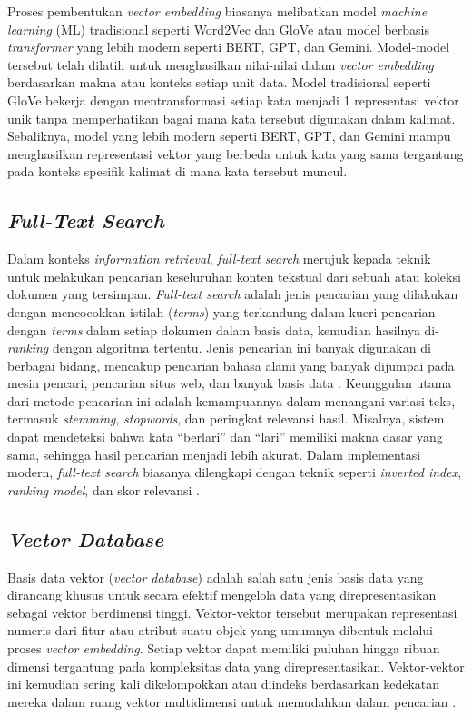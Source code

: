Proses pembentukan \textit{vector embedding} biasanya melibatkan model \textit{machine learning} (ML) tradisional seperti Word2Vec dan GloVe atau model berbasis \textit{transformer} yang lebih modern seperti BERT, GPT, dan Gemini.
Model-model tersebut telah dilatih untuk menghasilkan nilai-nilai dalam \textit{vector embedding} berdasarkan makna atau konteks setiap unit data.
Model tradisional seperti GloVe bekerja dengan mentransformasi setiap kata menjadi 1 representasi vektor unik tanpa memperhatikan bagai mana kata tersebut digunakan dalam kalimat.
Sebaliknya, model yang lebih modern seperti BERT, GPT, dan Gemini mampu menghasilkan representasi vektor yang berbeda untuk kata yang sama tergantung pada konteks spesifik kalimat di mana kata tersebut muncul.

\subsection{\textit{Full-Text Search}}
Dalam konteks \textit{information retrieval}, \textit{full-text search} merujuk kepada teknik untuk melakukan pencarian keseluruhan konten tekstual dari sebuah atau koleksi dokumen yang tersimpan.
\textit{Full-text search} adalah jenis pencarian yang dilakukan dengan mencocokkan istilah (\textit{terms}) yang terkandung dalam kueri pencarian dengan \textit{terms} dalam setiap dokumen dalam basis data, kemudian hasilnya di-\textit{ranking} dengan algoritma tertentu.
Jenis pencarian ini banyak digunakan di berbagai bidang, mencakup pencarian bahasa alami yang banyak dijumpai pada mesin pencari, pencarian situs web, dan banyak basis data \cite{beall2008weaknesses}.
Keunggulan utama dari metode pencarian ini adalah kemampuannya dalam menangani variasi teks, termasuk \textit{stemming}, \textit{stopwords}, dan peringkat relevansi hasil.
Misalnya, sistem dapat mendeteksi bahwa kata “berlari” dan “lari” memiliki makna dasar yang sama, sehingga hasil pencarian menjadi lebih akurat.
Dalam implementasi modern, \textit{full-text search} biasanya dilengkapi dengan teknik seperti \textit{inverted index}, \textit{ranking model}, dan skor relevansi \cite{mongodb2025fulltext}.

\subsection{\textit{Vector Database}}
Basis data vektor (\textit{vector database}) adalah salah satu jenis basis data yang dirancang khusus untuk secara efektif mengelola data yang direpresentasikan sebagai vektor berdimensi tinggi.
Vektor-vektor tersebut merupakan representasi numeris dari fitur atau atribut suatu objek yang umumnya dibentuk melalui proses \textit{vector embedding}.
Setiap vektor dapat memiliki puluhan hingga ribuan dimensi tergantung pada kompleksitas data yang direpresentasikan.
Vektor-vektor ini kemudian sering kali dikelompokkan atau diindeks berdasarkan kedekatan mereka dalam ruang vektor multidimensi untuk memudahkan dalam pencarian \cite{Han2023VectorDB_ANN_SimilaritySearch}.

